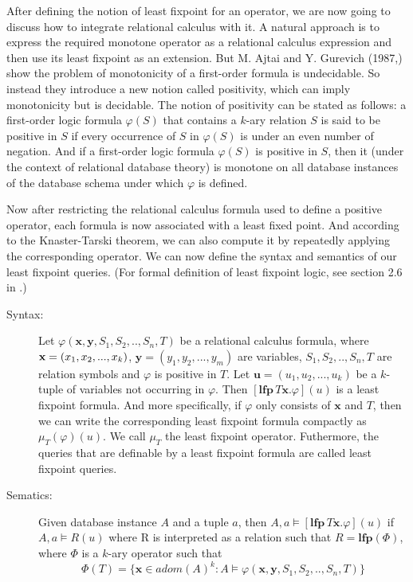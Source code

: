 After defining the notion of least fixpoint for an operator, we are now going to discuss how to integrate relational calculus with it. A natural approach is to express the required monotone operator as a relational calculus expression and then use its least fixpoint as an extension. But M. Ajtai and Y. Gurevich (1987,\cite{Ajtai}) show the problem of monotonicity of a first-order formula is undecidable. So instead they introduce a new notion called positivity, which can imply monotonicity but is decidable. The notion of positivity can be stated as follows: a first-order logic formula $\varphi(S)$ that contains a $k$-ary relation $S$ is said to be positive in $S$ if every occurrence of $S$ in $\varphi(S)$ is under an even number of negation. And if a first-order logic formula $\varphi(S)$ is positive in $S$, then it (under the context of relational database theory) is monotone on all database instances of the database schema under which $\varphi$ is defined.

Now after restricting the relational calculus formula used to define a positive operator, each formula is now associated with a least fixed point. And according to the Knaster-Tarski theorem, we can also compute it by repeatedly applying the corresponding operator. We can now define the syntax and semantics of our least fixpoint queries. (For formal definition of least fixpoint logic, see section 2.6 in \cite{kolaitis1}.)

\begin{description}

\item[Syntax:]
Let $\varphi(\textbf{x},\textbf{y}, S_1,S_2,..,S_n, T)$ be a relational calculus formula, where $\textbf{x}=(x_1, \\x_2,...,x_k)$, $\textbf{y}=(y_1,y_2,...,y_m)$ are variables, $S_1,S_2,..,S_n, T$ are relation symbols and $\varphi$ is positive in $T$. Let $\textbf{u}=(u_1, u_2,...,u_k)$ be a $k$-tuple of variables not occurring in $\varphi$. Then $[\textbf{lfp}\,T\textbf{x}.\varphi](u)$ is a least fixpoint formula. And more specifically, if $\varphi$ only consists of $\textbf{x}$ and $T$, then we can write the corresponding least fixpoint formula compactly as $\mu_T(\varphi)(u)$. We call $\mu_T$ the least fixpoint operator. Futhermore, the queries that are definable by a least fixpoint formula are called least fixpoint queries.

\item[Sematics:]
Given database instance $A$ and a tuple $a$, then $A, a \models [\textbf{lfp}\,T\textbf{x}.\varphi](u)$ if $A, a \models R(u)$ where R is interpreted as a relation such that $R=\textbf{lfp}(\Phi)$, where $\Phi$ is a $k$-ary operator such that
$$ \Phi(T) = \{\textbf{x}\in adom(A)^k: A\models \varphi(\textbf{x},\textbf{y},S_1,S_2,..,S_n,T)\}$$ 

\end{description}

